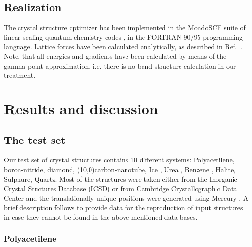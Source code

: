 \documentclass[prl,aps,preprint,superbib,12pt]{revtex4}
\begin{document}
\subsection{Realization}
The crystal structure optimizer has been implemented in the
MondoSCF suite of linear scaling quantum chemistry codes 
\cite{MondoSCF}, in the FORTRAN-90/95 programming language.
Lattice forces have been calculated analytically, as described in 
Ref.~\cite{CJTymczak04LatF}. Note, that all energies and gradients
have been calculated by means of the gamma point approximation,
i.e. there is no band structure calculation in our treatment.

\section{Results and discussion}
\subsection{The test set}
Our test set of crystal structures contains
10 different systems:
Polyacetilene, boron-nitride, diamond, (10,0)carbon-nanotube,
Ice \cite{AGoto90}, Urea \cite{SSwaminathan84}, 
Benzene \cite{GJeffrey87}, Halite, Sulphure, Quartz.
Most of the structures were
taken either from the Inorganic Crystal Stuctures Database
(ICSD) \cite{ICSD} or from Cambridge Crystallographic Data Center
\cite{CCDC} and the translationally unique positions were
generated using Mercury \cite{Mercury}. 
A brief description follows to provide data for the reproduction
of input structures in case they cannot be found
in the above mentioned data bases. 

\subsubsection{Polyacetilene}



\end{document}
